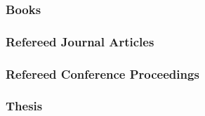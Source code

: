 \subsubsection*{Books}


%

\subsubsection*{Refereed Journal Articles}


%

\subsubsection*{Refereed Conference Proceedings}


%







%

\subsubsection*{Thesis}

